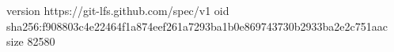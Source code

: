 version https://git-lfs.github.com/spec/v1
oid sha256:f908803c4e22464f1a874eef261a7293ba1b0e869743730b2933ba2e2c751aac
size 82580
